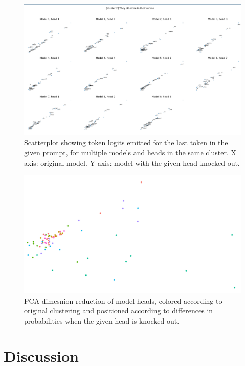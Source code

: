 \documentclass{article}
\begin{document}
\begin{figure}
	\includegraphics[width=\textwidth]{images/knockout-one-prompt-many-models.png}
	\caption{Scatterplot showing token logits emitted for the last token in the given prompt, for multiple models and heads in the same cluster. X axis: original model. Y axis: model with the given head knocked out.}
	\label{fig:knockout-one-prompt-many-models}
\end{figure}

\begin{figure}
	\includegraphics[width=\textwidth]{images/knockout-64prompt.png}
	\caption{PCA dimesnion reduction of model-heads, colored according to original clustering and positioned according to differences in probabilities when the given head is knocked out.}
	\label{fig:knockout-64prompt}
\end{figure}


\section{Discussion}
\end{document}
